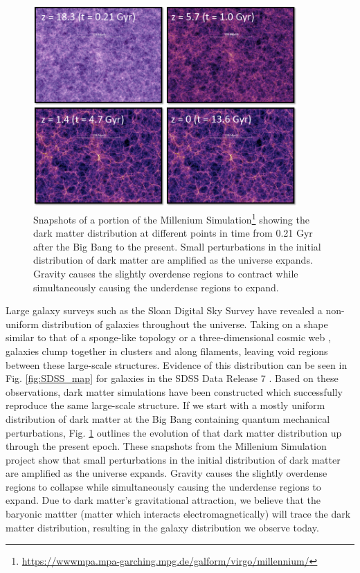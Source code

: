 \begin{figure}
    \includegraphics[width=0.9\textwidth]{Images/Intro/Millenium_simulation}
    \caption[Dark matter simulation]{Snapshots of a portion of the Millenium 
    Simulation\footnote{\url{https://wwwmpa.mpa-garching.mpg.de/galform/virgo/millennium/}} 
    showing the dark matter distribution at different points in time from 0.21 
    Gyr after the Big Bang to the present.  Small perturbations in the initial 
    distribution of dark matter are amplified as the universe expands.  Gravity 
    causes the slightly overdense regions to contract while simultaneously 
    causing the underdense regions to expand.}
    \label{fig:DMsim}
\end{figure}

Large galaxy surveys such as the Sloan Digital Sky Survey \citep[SDSS;][]
{York00} have revealed a non-uniform distribution of galaxies throughout 
the universe.  Taking on a shape similar to that of a sponge-like topology 
\citep{Gott98} or a three-dimensional cosmic web \citep{Bond96}, galaxies clump 
together in clusters and along filaments, leaving void regions between these 
large-scale structures.  Evidence of this distribution can be seen in Fig. 
\ref{fig:SDSS_map} for galaxies in the SDSS Data Release 7 \citep[SDSS DR7;][]
{Abazajian09}.  Based on these observations, dark matter simulations have been 
constructed which successfully reproduce the same large-scale structure.  If we 
start with a mostly uniform distribution of dark matter at the Big Bang 
containing quantum mechanical perturbations, Fig. \ref{fig:DMsim} outlines the 
evolution of that dark matter distribution up through the present epoch.  These 
snapshots from the Millenium Simulation project \citep{Springel05} show that 
small perturbations in the initial distribution of dark matter are amplified as 
the universe expands.  Gravity causes the slightly overdense regions to collapse 
while simultaneously causing the underdense regions to expand.  Due to dark 
matter's gravitational attraction, we believe that the baryonic mattter (matter 
which interacts electromagnetically) will trace the dark matter distribution, 
resulting in the galaxy distribution we observe today.


